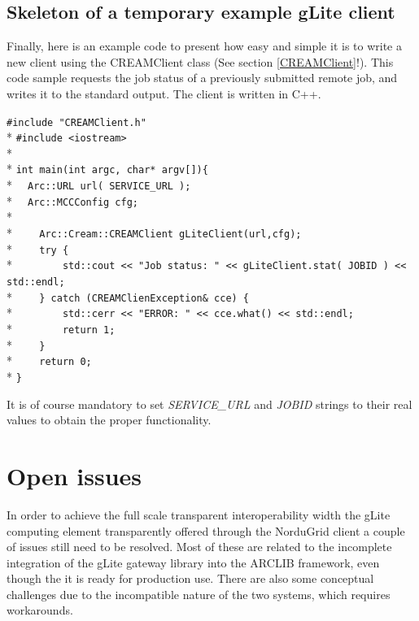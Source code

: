 \documentclass{article}
\begin{document}
\subsection{Skeleton of a temporary example gLite client}
Finally, here is an example code to present how easy and simple it is to write a new client using the CREAMClient class (See section \ref{CREAMClient}!). This code sample requests the job status of a previously submitted remote job, and writes it to the standard output. The client is written in C++.
\begin{framed}
\verb?#include "CREAMClient.h"?\\*
\verb?#include <iostream>?\\*
\\*
\verb?int main(int argc, char* argv[]){?\\*
\verb?  Arc::URL url( SERVICE_URL );?\\*
\verb?  Arc::MCCConfig cfg;?\\*
\\*
\verb?    Arc::Cream::CREAMClient gLiteClient(url,cfg);?\\*
\verb?    try {?\\*
\verb?        std::cout << "Job status: " << gLiteClient.stat( JOBID ) << std::endl;?\\*
\verb?    } catch (CREAMClienException& cce) {?\\*
\verb?        std::cerr << "ERROR: " << cce.what() << std::endl;?\\*
\verb?        return 1;?\\*
\verb?    }?\\*
\verb?    return 0;?\\*
\verb?}?
\end{framed}
It is of course mandatory to set \textit{SERVICE\_URL} and \textit{JOBID} strings to their real values to obtain the proper functionality.
\section{Open issues}
In order to achieve the full scale transparent interoperability width the gLite computing element transparently offered through the NorduGrid client a couple of issues still need to be resolved. Most of these are related to the incomplete integration of the gLite gateway library into the ARCLIB framework, even though the it is ready for production use. There are also some conceptual challenges due to the incompatible nature of the two systems, which requires workarounds.
\end{document}
